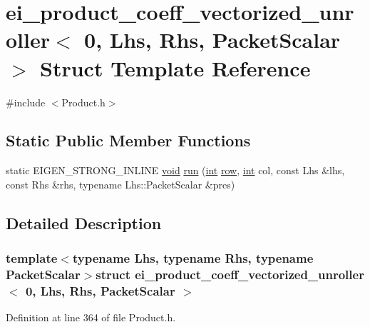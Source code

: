 \hypertarget{structei__product__coeff__vectorized__unroller_3_010_00_01_lhs_00_01_rhs_00_01_packet_scalar_01_4}{\section{ei\-\_\-product\-\_\-coeff\-\_\-vectorized\-\_\-unroller$<$ 0, Lhs, Rhs, Packet\-Scalar $>$ Struct Template Reference}
\label{structei__product__coeff__vectorized__unroller_3_010_00_01_lhs_00_01_rhs_00_01_packet_scalar_01_4}
}


{\ttfamily \#include $<$Product.\-h$>$}

\subsection*{Static Public Member Functions}
\begin{DoxyCompactItemize}
\item 
static E\-I\-G\-E\-N\-\_\-\-S\-T\-R\-O\-N\-G\-\_\-\-I\-N\-L\-I\-N\-E \hyperlink{group___u_a_v_objects_plugin_ga444cf2ff3f0ecbe028adce838d373f5c}{void} \hyperlink{structei__product__coeff__vectorized__unroller_3_010_00_01_lhs_00_01_rhs_00_01_packet_scalar_01_4_ae503d6c997959cdfa7301d15cf43e634}{run} (\hyperlink{ioapi_8h_a787fa3cf048117ba7123753c1e74fcd6}{int} \hyperlink{glext_8h_a11b277b422822f784ee248b43eee3e1e}{row}, \hyperlink{ioapi_8h_a787fa3cf048117ba7123753c1e74fcd6}{int} col, const Lhs \&lhs, const Rhs \&rhs, typename Lhs\-::\-Packet\-Scalar \&pres)
\end{DoxyCompactItemize}


\subsection{Detailed Description}
\subsubsection*{template$<$typename Lhs, typename Rhs, typename Packet\-Scalar$>$struct ei\-\_\-product\-\_\-coeff\-\_\-vectorized\-\_\-unroller$<$ 0, Lhs, Rhs, Packet\-Scalar $>$}



Definition at line 364 of file Product.\-h.



